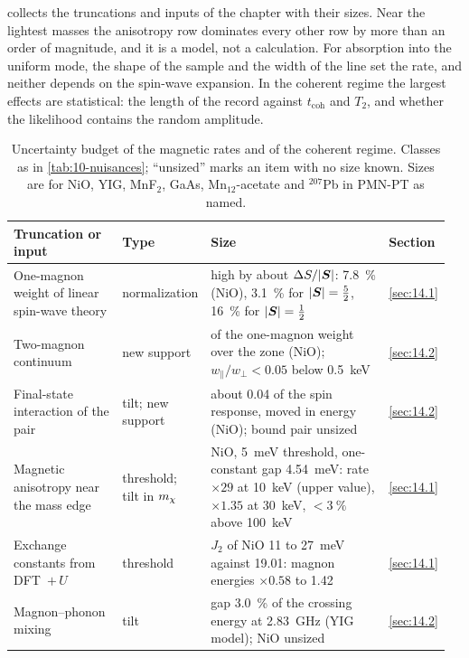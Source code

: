  collects the truncations and inputs of the chapter with their sizes. Near the lightest masses the anisotropy row dominates every other row by more than an order of magnitude, and it is a model, not a calculation. For absorption into the uniform mode, the shape of the sample and the width of the line set the rate, and neither depends on the spin-wave expansion. In the coherent regime the largest effects are statistical: the length of the record against $t_{\mathrm{coh}}$ and $T_2$, and whether the likelihood contains the random amplitude.
\begin{table}[tbp]
  \caption{Uncertainty budget of the magnetic rates and of the coherent regime. Classes as in \cref{tab:10-nuisances}; ``unsized'' marks an item with no size known. Sizes are for NiO, YIG, MnF$_2$, GaAs, Mn$_{12}$-acetate and $^{207}$Pb in PMN-PT as named.}
  \label{tab:14-nuisances}
  \centering\scriptsize\setlength{\tabcolsep}{3pt}
  \begin{tabular}{@{}>{\raggedright\arraybackslash}p{0.27\linewidth}>{\raggedright\arraybackslash}p{0.13\linewidth}>{\raggedright\arraybackslash}p{0.48\linewidth}>{\raggedright\arraybackslash}p{0.08\linewidth}@{}}
    \toprule
    Truncation or input & Type & Size & Section \\
    \midrule
    One-magnon weight of linear spin-wave theory & normali\-zation & high by about $\Delta S/|\bm{S}|$: \SI{7.8}{\percent} (NiO), \SI{3.1}{\percent} for $|\bm{S}| = \frac52$, \SI{16}{\percent} for $|\bm{S}| = \frac12$ & \cref{sec:14.1} \\
    Two-magnon continuum & new support & 0.073 of the one-magnon weight over the zone (NiO); $w_\parallel/w_\perp < 0.05$ below \SI{0.5}{keV} & \cref{sec:14.2} \\
    Final-state interaction of the pair & tilt; new support & about 0.04 of the spin response, moved in energy (NiO); bound pair unsized & \cref{sec:14.2} \\
    Magnetic anisotropy near the mass edge & threshold; tilt in $m_{\chi}$ & NiO, \SI{5}{meV} threshold, one-constant gap \SI{4.54}{meV}: rate $\times29$ at \SI{10}{keV} (upper value), $\times1.35$ at \SI{30}{keV}, $< \SI{3}{\percent}$ above \SI{100}{keV} & \cref{sec:14.1} \\
    Exchange constants from DFT~$+\,U$ & threshold & $J_2$ of NiO 11 to \SI{27}{meV} against 19.01: magnon energies $\times0.58$ to 1.42 & \cref{sec:14.1} \\
    Magnon--phonon mixing & tilt & gap \SI{3.0}{\percent} of the crossing energy at \SI{2.83}{GHz} (YIG model); NiO unsized & \cref{sec:14.2} \\

\end{tabular}
\end{table}
